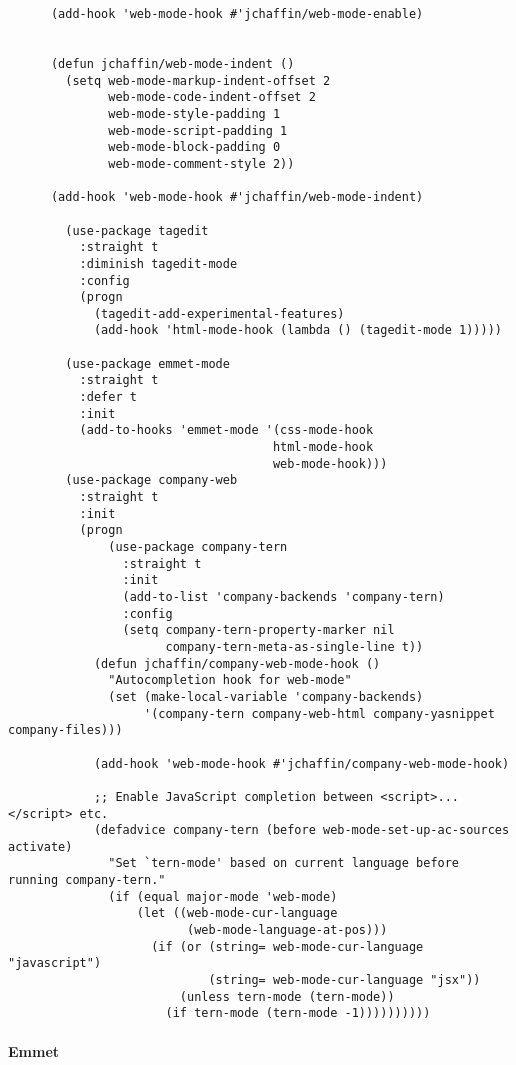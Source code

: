 \documentclass[11pt]{article}
\begin{document}
\begin{verbatim}
      (add-hook 'web-mode-hook #'jchaffin/web-mode-enable)


      (defun jchaffin/web-mode-indent ()
        (setq web-mode-markup-indent-offset 2
              web-mode-code-indent-offset 2
              web-mode-style-padding 1
              web-mode-script-padding 1
              web-mode-block-padding 0
              web-mode-comment-style 2))

      (add-hook 'web-mode-hook #'jchaffin/web-mode-indent)

        (use-package tagedit
          :straight t
          :diminish tagedit-mode
          :config
          (progn
            (tagedit-add-experimental-features)
            (add-hook 'html-mode-hook (lambda () (tagedit-mode 1)))))

        (use-package emmet-mode
          :straight t
          :defer t
          :init
          (add-to-hooks 'emmet-mode '(css-mode-hook
                                     html-mode-hook
                                     web-mode-hook)))
        (use-package company-web
          :straight t
          :init
          (progn
              (use-package company-tern
                :straight t
                :init
                (add-to-list 'company-backends 'company-tern)
                :config
                (setq company-tern-property-marker nil
                      company-tern-meta-as-single-line t))
            (defun jchaffin/company-web-mode-hook ()
              "Autocompletion hook for web-mode"
              (set (make-local-variable 'company-backends)
                   '(company-tern company-web-html company-yasnippet company-files)))

            (add-hook 'web-mode-hook #'jchaffin/company-web-mode-hook)

            ;; Enable JavaScript completion between <script>...</script> etc.
            (defadvice company-tern (before web-mode-set-up-ac-sources activate)
              "Set `tern-mode' based on current language before running company-tern."
              (if (equal major-mode 'web-mode)
                  (let ((web-mode-cur-language
                         (web-mode-language-at-pos)))
                    (if (or (string= web-mode-cur-language "javascript")
                            (string= web-mode-cur-language "jsx"))
                        (unless tern-mode (tern-mode))
                      (if tern-mode (tern-mode -1))))))))))
\end{verbatim}

\paragraph*{Emmet}
\label{sec:org991813f}
\end{document}
